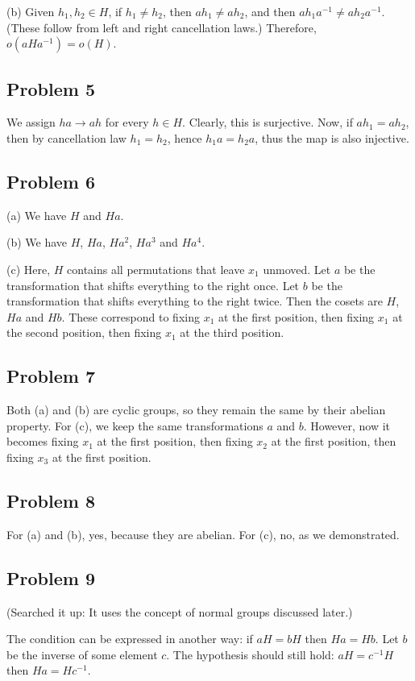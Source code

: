 \documentclass{book}
\begin{document}
\noindent
(b)
Given $h_1, h_2 \in H$, if $h_1 \neq h_2$, then $ah_1 \neq ah_2$, and then $ah_1a^{-1} \neq ah_2a^{-1}$. (These follow from left and right cancellation laws.) Therefore, $o(aHa^{-1}) = o(H)$.

\subsection*{Problem 5}
We assign $ha \rightarrow ah$ for every $h \in H$. Clearly, this is surjective. Now, if $ah_1 = ah_2$, then by cancellation law $h_1 = h_2$, hence $h_1 a = h_2 a$, thus the map is also injective.

\subsection*{Problem 6}
(a)
We have $H$ and $Ha$.

\noindent
(b)
We have $H$, $Ha$, $Ha^2$, $Ha^3$ and $Ha^4$.

\noindent
(c)
Here, $H$ contains all permutations that leave $x_1$ unmoved. Let $a$ be the transformation that shifts everything to the right once. Let $b$ be the transformation that shifts everything to the right twice. Then the cosets are $H$, $Ha$ and $Hb$. These correspond to fixing $x_1$ at the first position, then fixing $x_1$ at the second position, then fixing $x_1$ at the third position.

\subsection*{Problem 7}
Both (a) and (b) are cyclic groups, so they remain the same by their abelian property. For (c), we keep the same transformations $a$ and $b$. However, now it becomes fixing $x_1$ at the first position, then fixing $x_2$ at the first position, then fixing $x_3$ at the first position.

\subsection*{Problem 8}
For (a) and (b), yes, because they are abelian. For (c), no, as we demonstrated.

\subsection*{Problem 9}
(Searched it up: It uses the concept of normal groups discussed later.)

The condition can be expressed in another way: if $aH = bH$ then $Ha = Hb$. Let $b$ be the inverse of some element $c$. The hypothesis should still hold: $aH = c^{-1}H$ then $Ha = Hc^{-1}$.
\end{document}
